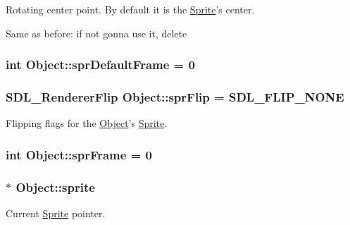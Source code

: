 Rotating center point. By default it is the \hyperlink{class_sprite}{Sprite}'s center. 

Same as before\-: if not gonna use it, delete \hypertarget{class_object_afc05c8f84fe3feb003332413f1e5ef75}{
\subsubsection[{spr\-Default\-Frame}]{\setlength{\rightskip}{0pt plus 5cm}int Object\-::spr\-Default\-Frame = 0\hspace{0.3cm}{\ttfamily [protected]}}}\label{class_object_afc05c8f84fe3feb003332413f1e5ef75}
\hypertarget{class_object_a1b77d0f13f96d477047be48ae41fb3ea}{
\subsubsection[{spr\-Flip}]{\setlength{\rightskip}{0pt plus 5cm}S\-D\-L\-\_\-\-Renderer\-Flip Object\-::spr\-Flip = S\-D\-L\-\_\-\-F\-L\-I\-P\-\_\-\-N\-O\-N\-E\hspace{0.3cm}{\ttfamily [protected]}}}\label{class_object_a1b77d0f13f96d477047be48ae41fb3ea}


Flipping flags for the \hyperlink{class_object}{Object}'s \hyperlink{class_sprite}{Sprite}. 

\hypertarget{class_object_ad61c7c0c72c28dd4abbc5f14cfdf3f18}{
\subsubsection[{spr\-Frame}]{\setlength{\rightskip}{0pt plus 5cm}int Object\-::spr\-Frame = 0\hspace{0.3cm}{\ttfamily [protected]}}}\label{class_object_ad61c7c0c72c28dd4abbc5f14cfdf3f18}
\hypertarget{class_object_ad936466f3f6b6e8fa401842c573b44e6}{
\subsubsection[{sprite}]{$\ast$ Object\-::sprite}}\label{class_object_ad936466f3f6b6e8fa401842c573b44e6}


Current \hyperlink{class_sprite}{Sprite} pointer. 

